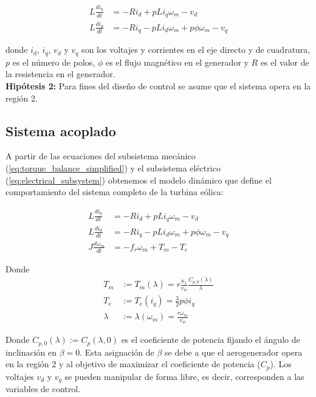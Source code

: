 \begin{equation}
    \begin{aligned}
        L\frac{di_q}{dt} &= -Ri_d + pLi_q\omega_m - v_d
        \\
        L\frac{di_d}{dt} &= -Ri_q - pLi_d\omega_m + p\phi\omega_m - v_q 
    \end{aligned}
    \label{eq:electrical_subsystem}
\end{equation}

donde $i_d$, $i_q$, $v_d$ y $v_q$ son los voltajes y corrientes en el eje directo y de cuadratura, $p$ es el número de polos,
$\phi$ es el flujo magnético en el generador y $R$ es el valor de la resistencia en el generador. 
\\

\textbf{Hipótesis 2:} Para fines del diseño de control se asume que el sistema opera en la región 2.

\subsection{Sistema acoplado}

A partir de las ecuaciones del subsistema mecánico (\ref{eq:torque_balance_simplified}) y el subsistema eléctrico (\ref{eq:electrical_subsystem}) 
obtenemos el modelo dinámico que define el comportamiento del sistema completo de la turbina eólica:

\begin{equation}\label{eq:full_system}
    \begin{aligned}
        L\frac{di_q}{dt} &= -Ri_d + pLi_q\omega_m - v_d
        \\
        L\frac{di_d}{dt} &= -Ri_q - pLi_d\omega_m + p\phi\omega_m - v_q 
        \\
        J \frac{d\omega_m}{dt} &= -f_r \omega_m + T_m - T_e
    \end{aligned}
\end{equation}

Donde
\begin{align}
    T_m &:=T_m(\lambda)= r\frac{\kappa_1}{v_w} \frac{C_{p,0}(\lambda)}{\lambda}
    \\
    T_e  &:= T_e(i_q)= \frac{3}{2}p\phi i_q
    \\
    \lambda &:=\lambda(\omega_m)= \frac{r\omega_m}{v_w}
    \label{eq:definitions}
\end{align}

Donde $C_{p,0}(\lambda) := C_p(\lambda,0)$ es el coeficiente de potencia fijando el ángulo 
de inclinación en $\beta = 0$. Esta asignación de $\beta$ se debe a que el aerogenerador opera en la región 2 
y al objetivo de maximizar el coeficiente de potencia ($C_p$).
Los voltajes $v_d$ y $v_q$ se pueden manipular de forma libre, es decir, corresponden a las variables de control.

